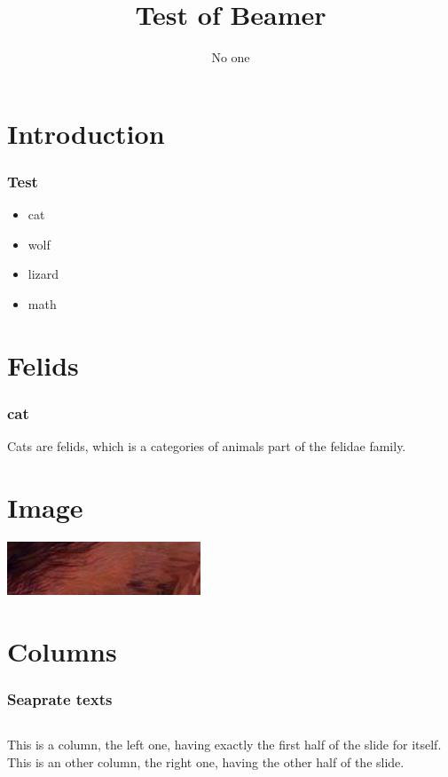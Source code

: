 \documentclass{beamer} %
\title{Test of Beamer}
\author{No one}
\date{}
\begin{document}
\maketitle

\section{Introduction}
\begin{frame} %
\frametitle{Test} %

\begin{itemize}
	\item cat \pause %
	\item wolf \pause %
	\item lizard \pause
	\item math %
\end{itemize}
\end{frame}

\section{Felids}
\begin{frame}
\frametitle{cat}
Cats are felids, which is a categories of animals part of the felidae family. %
\end{frame}

\section{Image}
\begin{frame}
\includegraphics{images/image.png} %
\end{frame}

\section{Columns}
\begin{frame}
\frametitle{Seaprate texts}
\begin{columns}
This is a column, the left one, having exactly the first half of the slide for itself.
This is an other column, the right one, having the other half of the slide.
\end{columns}
\end{frame}
\end{document}
